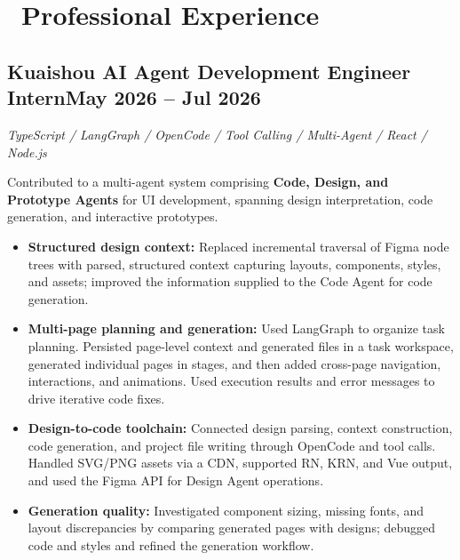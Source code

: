 \documentclass[10pt,a4paper]{article}
\newcommand{\datedsubsection}[2]{\subsection{\textbf{#1}\hfill\normalfont\small #2}}
\newcommand{\tech}[1]{{\fontsize{9.3}{12}\selectfont\itshape #1\par}\vspace{1pt}}
\begin{document}
\section{\faUsers\ Professional Experience}
\datedsubsection{Kuaishou \quad AI Agent Development Engineer Intern}{May 2026 -- Jul 2026}
\tech{TypeScript / LangGraph / OpenCode / Tool Calling / Multi-Agent / React / Node.js}
Contributed to a multi-agent system comprising \textbf{Code, Design, and Prototype Agents} for UI development, spanning design interpretation, code generation, and interactive prototypes.
\begin{itemize}
  \item \textbf{Structured design context:} Replaced incremental traversal of Figma node trees with parsed, structured context capturing layouts, components, styles, and assets; improved the information supplied to the Code Agent for code generation.
  \item \textbf{Multi-page planning and generation:} Used LangGraph to organize task planning. Persisted page-level context and generated files in a task workspace, generated individual pages in stages, and then added cross-page navigation, interactions, and animations. Used execution results and error messages to drive iterative code fixes.
  \item \textbf{Design-to-code toolchain:} Connected design parsing, context construction, code generation, and project file writing through OpenCode and tool calls. Handled SVG/PNG assets via a CDN, supported RN, KRN, and Vue output, and used the Figma API for Design Agent operations.
  \item \textbf{Generation quality:} Investigated component sizing, missing fonts, and layout discrepancies by comparing generated pages with designs; debugged code and styles and refined the generation workflow.
\end{itemize}
\end{document}
